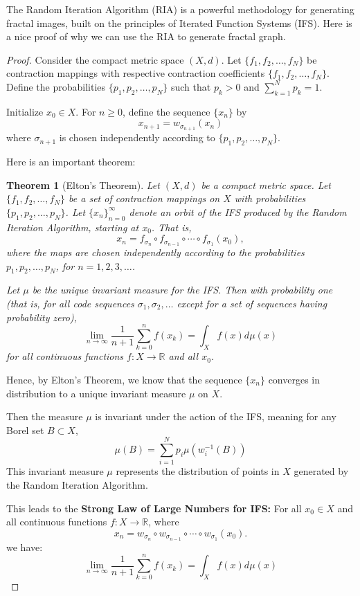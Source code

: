 \documentclass[a4paper,11pt, titlepage]{article}
\theoremstyle{definition}
\theoremstyle{plain}
\newtheorem{theorem}{Theorem}[section]
\theoremstyle{remark}
\theoremstyle{definition}
\begin{document}
The Random Iteration Algorithm (RIA) is a powerful methodology for generating fractal images, built on the principles of Iterated Function Systems (IFS). Here is a nice proof of why we can use the RIA to generate fractal graph.


\begin{proof}
Consider the compact metric space \((X, d)\). Let \(\{f_1, f_2, \ldots, f_N\}\) be contraction mappings with respective contraction coefficients \(\{f_1, f_2, \ldots, f_N\}\). Define the probabilities \(\{p_1, p_2, \ldots, p_N\}\) such that \(p_k > 0\) and \(\sum_{k=1}^N p_k = 1\).

Initialize \(x_0 \in X\). For \(n \geq 0\), define the sequence \(\{x_n\}\) by
\[ x_{n+1} = w_{\sigma_{n+1}}(x_n) \]
where \(\sigma_{n+1}\) is chosen independently according to \(\{p_1, p_2, \ldots, p_N\}\).

Here is an important theorem:

\begin{theorem}[Elton's Theorem]
Let \((X, d)\) be a compact metric space. Let \(\{f_1, f_2, \ldots, f_N\}\) be a set of contraction mappings on \(X\) with probabilities \(\{p_1, p_2, \ldots, p_N\}\). Let \(\{x_n\}_{n=0}^\infty\) denote an orbit of the IFS produced by the Random Iteration Algorithm, starting at \(x_0\). That is,
\[
x_n = f_{\sigma_n} \circ f_{\sigma_{n-1}} \circ \cdots \circ f_{\sigma_1}(x_0),
\]
where the maps are chosen independently according to the probabilities \(p_1, p_2, \ldots, p_N\), for \(n = 1, 2, 3, \ldots\).

Let \(\mu\) be the unique invariant measure for the IFS. Then with probability one (that is, for all code sequences \(\sigma_1, \sigma_2, \ldots\) except for a set of sequences having probability zero),
\[
\lim_{n \to \infty} \frac{1}{n+1} \sum_{k=0}^n f(x_k) = \int_X f(x) d\mu(x)
\]
for all continuous functions \(f : X \to \mathbb{R}\) and all \(x_0\).
\end{theorem}


Hence, by Elton's Theorem, we know that the sequence \(\{x_n\}\) converges in distribution to a unique invariant measure \(\mu\) on \(X\).

Then the measure \(\mu\) is invariant under the action of the IFS, meaning for any Borel set \(B \subset X\),
\[ \mu(B) = \sum_{i=1}^N p_i \mu(w_i^{-1}(B)) \]
This invariant measure \(\mu\) represents the distribution of points in \(X\) generated by the Random Iteration Algorithm.

This leads to the \textbf{Strong Law of Large Numbers for IFS:} For all \(x_0 \in X\) and all continuous functions \(f : X \to \mathbb{R}\), where
\[
x_n = w_{\sigma_n} \circ w_{\sigma_{n-1}} \circ \cdots \circ w_{\sigma_1}(x_0).
\]we have:
\[ \lim_{n \to \infty} \frac{1}{n+1} \sum_{k=0}^n f(x_k) = \int_X f(x) d\mu(x) \]


\end{proof}
\end{document}
